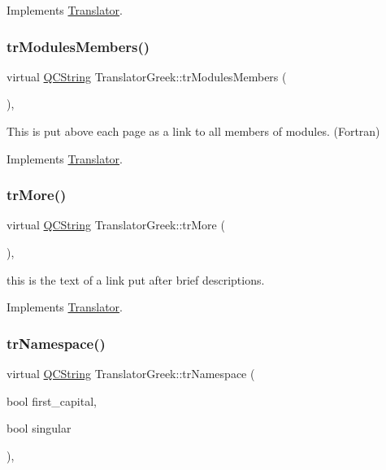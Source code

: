Implements \mbox{\hyperlink{class_translator}{Translator}}.

\mbox{\label{class_translator_greek_a132b48c2bd5949fc1d7815794358c258}} 
\subsubsection{\texorpdfstring{trModulesMembers()}{trModulesMembers()}}
{\footnotesize\ttfamily virtual \mbox{\hyperlink{class_q_c_string}{Q\+C\+String}} Translator\+Greek\+::tr\+Modules\+Members (\begin{DoxyParamCaption}{ }\end{DoxyParamCaption})\hspace{0.3cm}{\ttfamily [inline]}, {\ttfamily [virtual]}}

This is put above each page as a link to all members of modules. (Fortran) 

Implements \mbox{\hyperlink{class_translator}{Translator}}.

\mbox{\label{class_translator_greek_ab1feb11262f8ac7c080d358d9ea372b9}} 
\subsubsection{\texorpdfstring{trMore()}{trMore()}}
{\footnotesize\ttfamily virtual \mbox{\hyperlink{class_q_c_string}{Q\+C\+String}} Translator\+Greek\+::tr\+More (\begin{DoxyParamCaption}{ }\end{DoxyParamCaption})\hspace{0.3cm}{\ttfamily [inline]}, {\ttfamily [virtual]}}

this is the text of a link put after brief descriptions. 

Implements \mbox{\hyperlink{class_translator}{Translator}}.

\mbox{\label{class_translator_greek_ace34ca7159fe2b92c2d5dda9a42598e8}} 
\subsubsection{\texorpdfstring{trNamespace()}{trNamespace()}}
{\footnotesize\ttfamily virtual \mbox{\hyperlink{class_q_c_string}{Q\+C\+String}} Translator\+Greek\+::tr\+Namespace (\begin{DoxyParamCaption}\item[{bool}]{first\+\_\+capital,  }\item[{bool}]{singular }\end{DoxyParamCaption})\hspace{0.3cm}{\ttfamily [inline]}, {\ttfamily [virtual]}}

